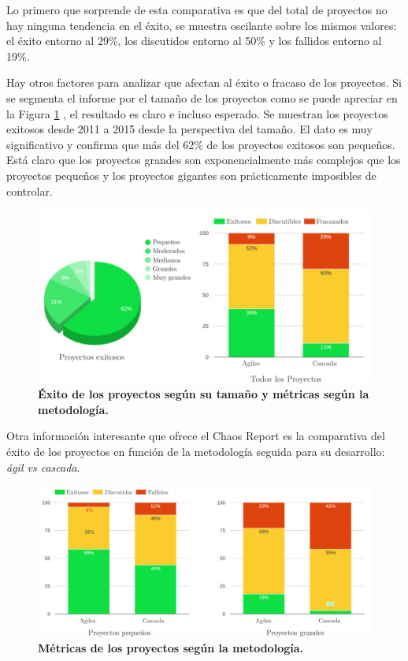 Lo primero que sorprende de esta comparativa es que del total de proyectos no hay ninguna tendencia en el éxito, se muestra oscilante sobre los mismos valores: el éxito entorno al 29\%, los discutidos entorno al 50\% y los fallidos entorno al 19\%. 

Hay otros factores para analizar que afectan al éxito o fracaso de los proyectos. Si se segmenta el informe por el tamaño de los proyectos como se puede apreciar en la Figura \ref{fig:caos1} , el resultado es claro e incluso esperado.
Se muestran los proyectos exitosos desde 2011 a 2015 desde la perspectiva del tamaño. El dato es muy significativo y confirma que más del 62\% de los proyectos exitosos son pequeños. Está claro que los proyectos grandes son exponencialmente más complejos que los proyectos pequeños y los proyectos gigantes son prácticamente imposibles de controlar.

\begin{figure}[h]
\includegraphics[width=15cm]{Img/Desarrollo/caos1.png}
\centering
\caption{\textbf{ \footnotesize{Éxito de los proyectos según su tamaño y métricas según la metodología.}}}
\label{fig:caos1}
\end{figure}

Otra información interesante que ofrece el Chaos Report es la comparativa del éxito de los proyectos en función de la metodología seguida para su desarrollo: \textit{ágil vs cascada}.

\begin{figure}[h]
\includegraphics[width=15cm]{Img/Desarrollo/caos2.png}
\centering
\caption{\textbf{ \footnotesize{Métricas de los proyectos según la metodología.}}}
\label{fig:caos2}
\end{figure}

